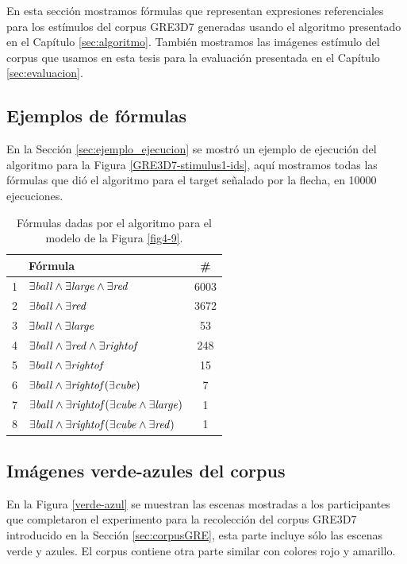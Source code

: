 En esta secci\'on mostramos f\'ormulas que representan expresiones referenciales para los est\'imulos del corpus GRE3D7 generadas usando el algoritmo presentado en el Cap\'itulo \ref{sec:algoritmo}. Tambi\'en mostramos las im\'agenes est\'imulo del corpus que usamos en esta tesis para la evaluaci\'on presentada en el Cap\'itulo \ref{sec:evaluacion}. 

\subsection{Ejemplos de f\'ormulas}
\label{formulas-fmo}

En la Secci\'on \ref{sec:ejemplo_ejecucion} se mostr\'o un ejemplo de ejecuci\'on del algoritmo para la Figura \ref{GRE3D7-stimulus1-ids}, aqu\'i mostramos todas las f\'ormulas que di\'o el algoritmo para el target se\~nalado por la flecha, en 10000 ejecuciones.


\begin{table}[h]
\begin{center}
\begin{tabular}{|l|l|c|}
\hline
&F\'ormula			      &  \# \\ \hline \hline

1&$\exists \mathit{ball} \land \exists \mathit{large} \land \exists \mathit{red}$		&6003 \\ \hline
2&$\exists \mathit{ball} \land \exists \mathit{red}$		&3672 \\ \hline
3&$\exists \mathit{ball} \land \exists \mathit{large}$		&53 \\ \hline
4&$\exists \mathit{ball} \land \exists \mathit{red} \land \exists \mathit{rightof}$	&	248 \\ \hline
5&$\exists \mathit{ball} \land \exists \mathit{rightof}$		&15 \\ \hline
6&$\exists \mathit{ball} \land \exists \mathit{rightof}(\exists \mathit{cube})$	&	7 \\ \hline
7&$\exists \mathit{ball} \land \exists \mathit{rightof}(\exists \mathit{cube} \land \exists \mathit{large})$&		1 \\ \hline
8&$\exists \mathit{ball} \land \exists \mathit{rightof}(\exists \mathit{cube} \land \exists \mathit{red})$		&1 \\ \hline

\end{tabular}

\caption{F\'ormulas dadas por el algoritmo para el modelo de la Figura \protect\ref{fig4-9}.}\label{formulas-mapa-gre3d7-apendice}
\end{center}
\end{table}

\subsection{Im\'agenes verde-azules del corpus}
\label{imagenesGRE3D7-apendice}
En la Figura \ref{verde-azul} se muestran las escenas mostradas a los participantes que completaron el experimento para la recolecci\'on del corpus GRE3D7 introducido en la Secci\'on \ref{sec:corpusGRE}, esta parte incluye s\'olo las escenas verde y azules. El corpus contiene otra parte similar con colores rojo y amarillo.

